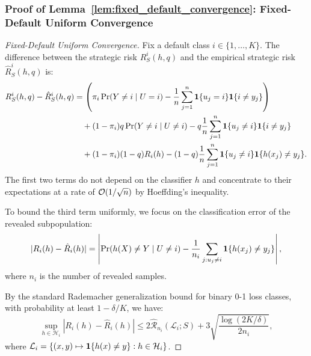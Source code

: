 \subsubsection*{Proof of Lemma~\ref{lem:fixed_default_convergence}: Fixed-Default Uniform Convergence}
\label{app:proof_fixed_default_convergence}
\begin{proof}[Fixed-Default Uniform Convergence]
Fix a default class $i \in \{1, \dots, K\}$. The difference between the strategic risk $R^i_S(h, q)$ and the empirical strategic risk $\hat{R}^i_S(h, q)$ is:
\begin{align}
    R^i_S(h, q) - \hat{R}^i_S(h, q) &= \left( \pi_i \Pr(Y \ne i \mid U = i) - \frac{1}{n}\sum_{j=1}^n \mathbf{1}\{u_j = i\}\mathbf{1}\{i \ne y_j\} \right) \nonumber \\
    &\quad + (1 - \pi_i)q\Pr(Y \ne i \mid U \ne i) - q\frac{1}{n}\sum_{j=1}^n \mathbf{1}\{u_j \ne i\}\mathbf{1}\{i \ne y_j\} \nonumber \\
    &\quad + (1 - \pi_i)(1 - q)R_i(h) - (1 - q)\frac{1}{n}\sum_{j=1}^n \mathbf{1}\{u_j \ne i\}\mathbf{1}\{h(x_j) \ne y_j\}.
\end{align}
The first two terms do not depend on the classifier $h$ and concentrate to their expectations at a rate of $\mathcal{O}(1/\sqrt{n})$ by Hoeffding's inequality.

To bound the third term uniformly, we focus on the classification error of the revealed subpopulation:
\begin{equation}
    |R_i(h) - \hat{R}_i(h)| = \left| \Pr(h(X) \ne Y \mid U \ne i) - \frac{1}{n_i}\sum_{j : u_j \ne i} \mathbf{1}\{h(x_j) \ne y_j\} \right|,
\end{equation}
where $n_i$ is the number of revealed samples.

By the standard Rademacher generalization bound for binary 0-1 loss classes, with probability at least $1 - \delta/K$, we have:
\begin{equation}
    \sup_{h \in \mathcal{H}_i} |R_i(h) - \hat{R}_i(h)| \le 2\hat{\mathcal{R}}_{n_i}(\mathcal{L}_i; S) + 3\sqrt{\frac{\log(2K/\delta)}{2n_i}},
\end{equation}
where $\mathcal{L}_i = \{(x, y) \mapsto \mathbf{1}\{h(x) \ne y\} : h \in \mathcal{H}_i\}$.


\end{proof}
